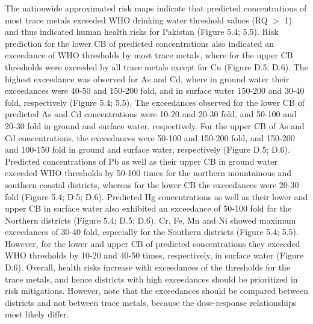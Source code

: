 The nationwide approximated risk maps indicate that predicted concentrations of most trace metals exceeded WHO drinking water threshold values (RQ $>$ 1) and thus indicated human health risks for Pakistan (Figure 5.4; 5.5). Risk prediction for the lower CB of predicted concentrations also indicated an exceedance of WHO thresholds by most trace metals, where for the upper CB thresholds were exceeded by all trace metals except for Cu (Figure D.5; D.6). The highest exceedance was observed for As and Cd, where in ground water their exceedances were 40-50 and 150-200 fold, and in surface water 150-200 and 30-40 fold, respectively (Figure 5.4; 5.5). The exceedances observed for the lower CB of predicted As and Cd concentrations were 10-20 and 20-30 fold, and 50-100 and 20-30 fold in ground and surface water, respectively. For the upper CB of As and Cd concentrations, the exceedances were 50-100 and 150-200 fold, and 150-200 and 100-150 fold in ground and surface water, respectively (Figure D.5; D.6). Predicted concentrations of Pb as well as their upper CB in ground water exceeded WHO thresholds by 50-100 times for the northern mountainous and southern coastal districts, whereas for the lower CB the exceedances were 20-30 fold (Figure 5.4; D.5; D.6). Predicted Hg concentrations as well as their lower and upper CB in surface water also exhibited an exceedance of 50-100 fold for the Northern districts (Figure 5.4; D.5; D.6). Cr, Fe, Mn and Ni showed maximum exceedances of 30-40 fold, especially for the Southern districts (Figure 5.4; 5.5). However, for the lower and upper CB of predicted concentrations they exceeded WHO thresholds by 10-20 and 40-50 times, respectively, in surface water (Figure D.6). Overall, health risks increase with exceedances of the thresholds for the trace metals, and hence districts with high exceedances should be prioritized in risk mitigations. However, note that the exceedances should be compared between districts and not between trace metals, because the dose-response relationships most likely differ.

